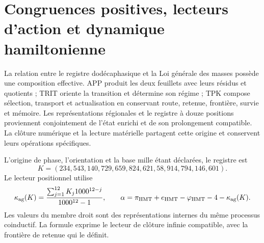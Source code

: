 
\section{Congruences positives, lecteurs d’action et dynamique hamiltonienne}
\label{sec:k-mass-bridge}

La relation entre le registre dodécaphasique et la Loi générale des masses possède une composition effective. APP produit les deux feuillets avec leurs résidus et quotients ; TRIT oriente la transition et détermine son régime ; TPK compose sélection, transport et actualisation en conservant route, retenue, frontière, survie et mémoire. Les représentations régionales et le registre à douze positions proviennent conjointement de l'état enrichi et de son prolongement compatible. La clôture numérique et la lecture matérielle partagent cette origine et conservent leurs opérations spécifiques.

L'origine de phase, l'orientation et la base mille étant déclarées, le registre est
\[
 K=(234,543,140,729,659,824,621,58,914,794,146,601).
\]
Le lecteur positionnel utilise
\begin{equation}
 \kappa_{\rm ag}(K)=\frac{\sum_{j=1}^{12}K_j1000^{12-j}}{1000^{12}-1},
 \qquad
 \alpha=\pi_{\rm HMT}+e_{\rm HMT}-\varphi_{\rm HMT}-4-
              \kappa_{\rm ag}(K).
 \label{eq:mass-k-alpha}
\end{equation}
Les valeurs du membre droit sont des représentations internes du même processus coinductif. La formule exprime le lecteur de clôture infinie compatible, avec la frontière de retenue qui le définit.

